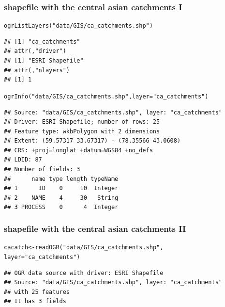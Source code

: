 \documentclass[xcolor=table, xcolor=dvipsnames]{beamer}\usepackage[]{graphicx}\usepackage[]{color}
\makeatletter
\newcommand{\hlstr}[1]{\textcolor[rgb]{0.545,0.137,0.137}{#1}}
\newcommand{\hlstd}[1]{\textcolor[rgb]{0,0,0}{#1}}
\newcommand{\hlkwb}[1]{\textcolor[rgb]{0,0,0}{#1}}
\newcommand{\hlkwc}[1]{\textcolor[rgb]{1,0,1}{#1}}
\newcommand{\hlkwd}[1]{\textcolor[rgb]{0,0,1}{#1}}
\newenvironment{kframe}{%
 \def\at@end@of@kframe{}%
 \ifinner\ifhmode%
  \def\at@end@of@kframe{\end{minipage}}%
  \begin{minipage}{\columnwidth}%
 \fi\fi%
 \def\FrameCommand##1{\hskip\@totalleftmargin \hskip-\fboxsep
 \colorbox{shadecolor}{##1}\hskip-\fboxsep
     \hskip-\linewidth \hskip-\@totalleftmargin \hskip\columnwidth}%
 \MakeFramed {\advance\hsize-\width
   \@totalleftmargin\z@ \linewidth\hsize
   \@setminipage}}%
 {\par\unskip\endMakeFramed%
 \at@end@of@kframe}
\newenvironment{knitrout}{}{} %
\makeatother
\begin{document}
\begin{frame}[fragile]\frametitle{shapefile with the central asian catchments I}
\begin{knitrout}\tiny
{}\color{fgcolor}\begin{kframe}
\begin{alltt}
\hlkwd{ogrListLayers}\hlstd{(}\hlstr{"data/GIS/ca_catchments.shp"}\hlstd{)}
\end{alltt}
\begin{verbatim}
## [1] "ca_catchments"
## attr(,"driver")
## [1] "ESRI Shapefile"
## attr(,"nlayers")
## [1] 1
\end{verbatim}
\begin{alltt}
\hlkwd{ogrInfo}\hlstd{(}\hlstr{"data/GIS/ca_catchments.shp"}\hlstd{,} \hlkwc{layer}\hlstd{=}\hlstr{"ca_catchments"}\hlstd{)}
\end{alltt}
\begin{verbatim}
## Source: "data/GIS/ca_catchments.shp", layer: "ca_catchments"
## Driver: ESRI Shapefile; number of rows: 25 
## Feature type: wkbPolygon with 2 dimensions
## Extent: (59.57317 33.67317) - (78.35566 43.0608)
## CRS: +proj=longlat +datum=WGS84 +no_defs  
## LDID: 87 
## Number of fields: 3 
##      name type length typeName
## 1      ID    0     10  Integer
## 2    NAME    4     30   String
## 3 PROCESS    0      4  Integer
\end{verbatim}
\end{kframe}
\end{knitrout}
\end{frame}


\begin{frame}[fragile]\frametitle{shapefile with the central asian catchments II}
\begin{knitrout}\footnotesize
{}\color{fgcolor}\begin{kframe}
\begin{alltt}
\hlstd{cacatch} \hlkwb{<-} \hlkwd{readOGR}\hlstd{(}\hlstr{"data/GIS/ca_catchments.shp"}\hlstd{,}
                   \hlkwc{layer}\hlstd{=}\hlstr{"ca_catchments"}\hlstd{)}
\end{alltt}
\begin{verbatim}
## OGR data source with driver: ESRI Shapefile 
## Source: "data/GIS/ca_catchments.shp", layer: "ca_catchments"
## with 25 features
## It has 3 fields
\end{verbatim}
\end{kframe}
\end{knitrout}
\end{frame}
\end{document}
